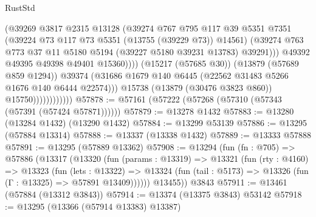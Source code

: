\begin{lexlean}{RustStd}
\begin{coremodule}
                                      (@39269
                                        @3817
                                        @2315
                                        @13128
                                        (@39274
                                          @767
                                          @795
                                          @117
                                          @39
                                          @5351
                                          @7351
                                          (@39224 @73 @117 @73 @5351 (@13755 (@39229 @73)) @14561)
                                          (@39274
                                            @763
                                            @773
                                            @37
                                            @11
                                            @5180
                                            @5194
                                            (@39227 @5180 @39231 @13783)
                                            @39291)))
                                      @49392
                                      @49395
                                      @49398
                                      @49401
                                      @15360))))
                              (@15217 (@57685 @30))
                              (@13879 (@57689 @859 @1294))
                              @39374
                              (@31686
                                @1679
                                @140
                                @6445
                                (@22562 @31483 @5266 @1676 @140 @6444 @22574)))
                            @15738
                            (@13879 (@30476 @3823 @860))
                            @15750))))))))))))
@57878 := @57161 (@57222 (@57268 (@57310 (@57343 (@57391 (@57424 @57871))))))
@57879 := @13278 @1432
@57883 := @13280 (@13284 @1432) (@13290 @1432)
@57884 := @13299 @53139
@57886 := @13295 (@57884 @13314)
@57888 := @13337 (@13338 @1432)
@57889 := @13333 @57888
@57891 := @13295 (@57889 @13362)
@57908 := @13294
    (fun (fn : @705) =>
    @57886
      (@13317
        (@13320
          (fun (params : @13319) =>
          @13321
            (fun (rty : @4160) =>
            @13323
              (fun (lets : @13322) =>
              @13324 (fun (tail : @5173) => @13326 (fun (Γ : @13325) => @57891 @13409))))))
        @13455))
    @3843
@57911 := @13461 (@57884 (@13312 @3843))
@57914 := @13374 (@13375 @3843) @53142
@57918 := @13295 (@13366 (@57914 @13383) @13387)

\end{coremodule}
\end{lexlean}
